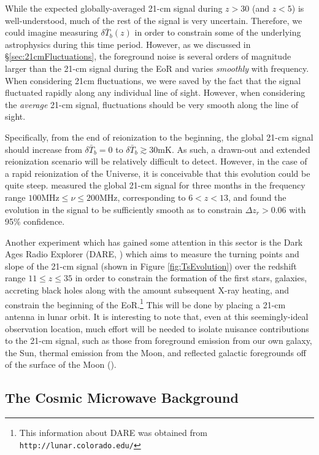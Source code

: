 While the expected globally-averaged 21-cm signal during $z > 30$ (and $z < 5$) is well-understood, much of the rest of the signal is very uncertain. Therefore, we could imagine measuring $\delta \bar{T}_{b}(z)$ in order to constrain some of the underlying astrophysics during this time period. However, as we discussed in \S \ref{sec:21cmFluctuations}, the foreground noise is several orders of magnitude larger than the 21-cm signal during the EoR and varies \textit{smoothly} with frequency. When considering 21cm fluctuations, we were saved by the fact that the signal fluctuated rapidly along any individual line of sight. However, when considering the \textit{average} 21-cm signal, fluctuations should be very smooth along the line of sight. 


Specifically, from the end of reionization to the beginning, the global 21-cm signal should increase from $\delta \bar{T}_{b} = 0$ to $\delta \bar{T}_{b} \gtrsim 30$mK. As such, a drawn-out and extended reionization scenario will be relatively difficult to detect. However, in the case of a rapid reionization of the Universe, it is conceivable that this evolution could be quite steep. \cite{bowman2010lower} measured the global 21-cm signal for three months in the frequency range $100\text{MHz} \leq \nu \leq 200\text{MHz}$, corresponding to $6 < z < 13$, and found the evolution in the signal to be sufficiently smooth as to constrain $\Delta z_{r} > 0.06$ with 95\% confidence. 


Another experiment which has gained some attention in this sector is the Dark Ages Radio Explorer (DARE, \citealt{burns2012probing}) which aims to measure the turning points and slope of the 21-cm signal (shown in Figure \ref{fig:TsEvolution}) over the redshift range $11 \leq z \leq 35$ in order to constrain the formation of the first stars, galaxies, accreting black holes along with the amount subsequent X-ray heating, and constrain the beginning of the EoR.\footnote{This information about DARE was obtained from {\tt http://lunar.colorado.edu/}} This will be done by placing a 21-cm antenna in lunar orbit. It is interesting to note that, even at this seemingly-ideal observation location, much effort will be needed to isolate nuisance contributions to the 21-cm signal, such as those from foreground emission from our own galaxy, the Sun, thermal emission from the Moon, and reflected galactic foregrounds off of the surface of the Moon (\citealt{harker2012mcmc}).

\clearpage
\subsection{The Cosmic Microwave Background}\label{sec:CMB}


